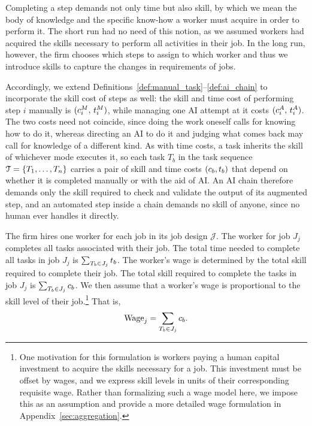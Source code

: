 Completing a step demands not only time but also skill, by which we mean the body of knowledge and the specific know-how a worker must acquire in order to perform it.
The short run had no need of this notion, as we assumed workers had acquired the skills necessary to perform all activities in their job. 
In the long run, however, the firm chooses which steps to assign to which worker and thus we introduce skills to capture the changes in requirements of jobs. 

Accordingly, we extend Definitions~\ref{def:manual_task}--\ref{def:ai_chain} to incorporate the skill cost of steps as well: 
the skill and time cost of performing step $i$ manually is $(c^{M}_{i},\, t^{M}_{i})$, while managing one AI attempt at it costs $(c^{A}_{i},\, t^{A}_{i})$.
The two costs need not coincide, since doing the work oneself calls for knowing how to do it, whereas directing an AI to do it and judging what comes back may call for knowledge of a different kind.
As with time costs, a task inherits the skill of whichever mode executes it, so each task $T_b$ in the task sequence $\mathcal{T} = \{T_1, \dotsc, T_n\}$ carries a pair of skill and time costs $(c_{b}, t_{b})$ that depend on whether it is completed manually or with the aid of AI.
An AI chain therefore demands only the skill required to check and validate the output of its augmented step, and an automated step inside a chain demands no skill of anyone, since no human ever handles it directly.

The firm hires one worker for each job in its job design $\mathcal{J}$.
The worker for job $J_j$ completes all tasks associated with their job.
The total time needed to complete all tasks in job $J_j$ is $\sum_{T_b \in J_j} t_{b}$.
The worker's wage is determined by the total skill required to complete their job.
The total skill required to complete the tasks in job $J_j$ is $\sum_{T_b \in J_j} c_{b}$.
We then assume that a worker's wage is proportional to the skill level of their job.\footnote{
One motivation for this formulation is workers paying a human capital investment to acquire the skills necessary for a job.
This investment must be offset by wages, and we express skill levels in units of their corresponding requisite wage.
Rather than formalizing such a wage model here, we impose this as an assumption and provide a more detailed wage formulation in Appendix~\ref{sec:aggregation}.
}
That is,
\begin{align}
\label{eq:wage}
\text{Wage}_j = \sum_{T_b \in J_j} c_{b}.
\end{align}

